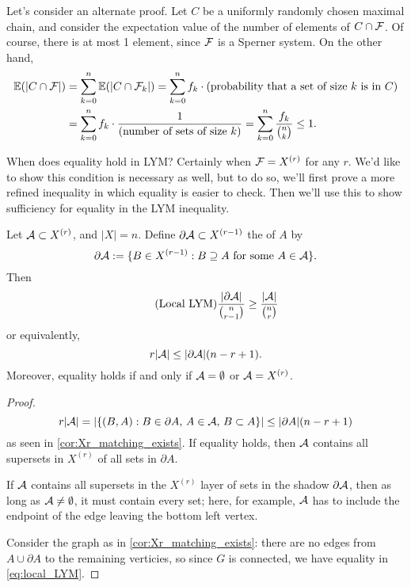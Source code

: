 \begin{remark}
Let's consider an alternate proof. Let $C$ be a uniformly randomly chosen maximal chain, and consider the expectation value of the number of elements of $C\cap \mathcal{F}$. Of course, there is at most 1 element, since $\mathcal{F}$ is a Sperner system. On the other hand,
\begin{align*}	
\mathbb{E} ( | C\cap \mathcal{F}|) &=\sum_{k=0}^n \mathbb{E}( | C \cap \mathcal{F}_k|) = \sum_{k=0}^n f_k \cdot (\text{probability that a set of size $k$ is in $C$})\\
 &=  \sum_{k=0}^n f_k \cdot \frac{1}{(\text{number of sets of size $k$)}} = \sum_{k=0}^n \frac{f_k}{{n \choose k}} \leq 1.
\end{align*}
\end{remark}


When does equality hold in LYM? Certainly when $\mathcal{F}= X^{(r)}$ for any $r$. We'd like to show this condition is necessary as well, but to do so, we'll first prove a more refined inequality in which equality is easier to check. Then we'll use this to show sufficiency for equality in the LYM inequality.

\begin{theorem} \label{thm:local_LYM}
Let $\mathcal{A}\subset X^{(r)}$, and $|X|=n$. Define
$\partial \mathcal{A} \subset X^{(r-1)}$
the  of $A$ by
\[
\partial \mathcal{A} := \{B\in X^{(r-1)}: B\supseteq A \text{ for some }A\in \mathcal{A} \}.
\]
Then
\begin{equation}	\label{eq:local_LYM} \tag{Local LYM}
\frac{|\partial \A|}{{n\choose r-1}} \geq \frac{|\A|}{{n \choose r}}
\end{equation}
or equivalently,
\[
 r| \mathcal{A}| \leq |\partial \mathcal{A}| (n-r+1).
\]
Moreover, equality holds if and only if $\mathcal{A}= \emptyset$ or $\mathcal{A}=  X^{(r)}$.
\end{theorem}
\begin{proof}	
\[
 r|\mathcal{A}| = | \{ (B,A): B\in \partial A, \, A\in \mathcal{A}, \, B\subset A\}| \leq |\partial A| (n-r+1)
 \] as seen in \cref{cor:Xr_matching_exists}.
If equality holds, then $\mathcal{A}$ contains all supersets in $X^{(r)}$ of all sets in $\partial A$. 


\begin{marginfigure}
\begin{center}
\end{center}
\caption{If $\mathcal{A}$ contains all supersets in the $X^{(r)}$ layer of sets in the shadow $\partial \mathcal{A}$, then as long as $\mathcal{A}\neq \emptyset$, it must contain every set; here, for example, $\mathcal{A}$ has to include the endpoint of the edge leaving the bottom left vertex. }
\end{marginfigure}

Consider the graph as in \cref{cor:Xr_matching_exists}:  there are no edges from $A\cup \partial A$ to the remaining verticies, so since $G$ is connected,  we have equality in \eqref{eq:local_LYM}.
\end{proof}

